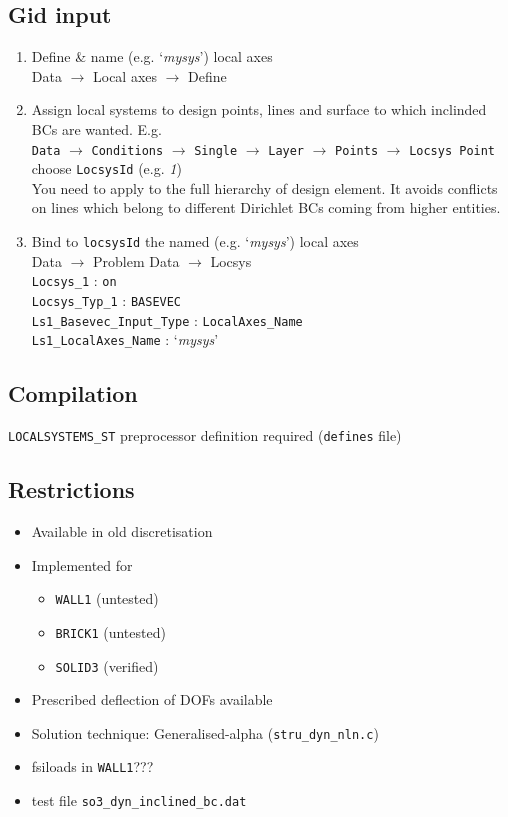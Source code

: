 \subsection{Gid input}
\begin{enumerate}
\item Define \& name (e.g. `\textit{mysys}') local axes\\
       Data $\to$ Local axes $\to$ Define
\item Assign local systems to design points, lines and surface to which
       inclinded BCs are wanted. E.g.\\
       \texttt{Data} $\to$ \texttt{Conditions} $\to$ \texttt{Single} $\to$ \texttt{Layer} $\to$ \texttt{Points} $\to$ \texttt{Locsys Point}\\
       choose \texttt{LocsysId} (e.g. \textit{1})\\
       You need to apply to the full hierarchy
       of design element. It avoids conflicts on lines which belong
       to different Dirichlet BCs coming from higher entities.
\item Bind to \texttt{locsysId} the named  (e.g. `\textit{mysys}') local axes\\
       Data $\to$ Problem Data $\to$ Locsys\\
       \texttt{Locsys\_1} : \texttt{on}\\
       \texttt{Locsys\_Typ\_1} : \texttt{BASEVEC}\\
       \texttt{Ls1\_Basevec\_Input\_Type} : \texttt{LocalAxes\_Name}\\
       \texttt{Ls1\_LocalAxes\_Name} : `\textit{mysys}'\\
\end{enumerate}

\subsection{Compilation}
\texttt{LOCALSYSTEMS\_ST} preprocessor definition required (\texttt{defines} file)

\subsection{Restrictions}
\begin{itemize}
\item Available in old discretisation
\item Implemented for 
   \begin{itemize}
   \item \texttt{WALL1} (untested)
   \item \texttt{BRICK1} (untested)
   \item \texttt{SOLID3} (verified)
   \end{itemize}
\item Prescribed deflection of DOFs available
\item Solution technique: Generalised-alpha (\texttt{stru\_dyn\_nln.c})
\item fsiloads in \texttt{WALL1}???
\item test file \texttt{so3\_dyn\_inclined\_bc.dat}
\end{itemize}

%
